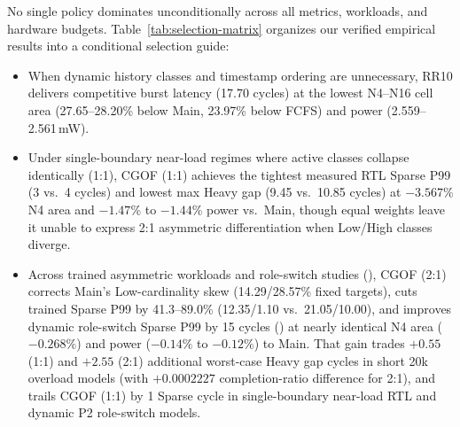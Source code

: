 No single policy dominates unconditionally across all metrics, workloads, and hardware budgets. Table~\ref{tab:selection-matrix} organizes our verified empirical results into a conditional selection guide:
\begin{itemize}
\item When dynamic history classes and timestamp ordering are unnecessary, RR10 delivers competitive burst latency (17.70 cycles) at the lowest N4--N16 cell area (27.65--28.20\% below Main, 23.97\% below FCFS) and power (2.559--2.561\,mW).
\item Under single-boundary near-load regimes where active classes collapse identically (1:1), CGOF (1:1) achieves the tightest measured RTL Sparse P99 (3 vs.\ 4 cycles) and lowest max Heavy gap (9.45 vs.\ 10.85 cycles) at $-3.567\%$ N4 area and $-1.47\%$ to $-1.44\%$ power vs.\ Main, though equal weights leave it unable to express 2:1 asymmetric differentiation when Low/High classes diverge.
\item Across trained asymmetric workloads and role-switch studies (), CGOF (2:1) corrects Main's Low-cardinality skew (14.29\slash 28.57\% fixed targets), cuts trained Sparse P99 by 41.3--89.0\% (12.35\slash 1.10 vs.\ 21.05\slash 10.00), and improves dynamic role-switch Sparse P99 by 15 cycles () at nearly identical N4 area ($-0.268\%$) and power ($-0.14\%$ to $-0.12\%$) to Main. That gain trades $+0.55$ (1:1) and $+2.55$ (2:1) additional worst-case Heavy gap cycles in short 20k overload models (with $+0.0002227$ completion-ratio difference for 2:1), and trails CGOF (1:1) by 1 Sparse cycle in single-boundary near-load RTL and dynamic P2 role-switch models.
\end{itemize}

